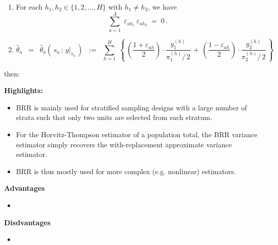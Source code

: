 \begin{proposition}
\begin{enumerate}
\item
	For each $h_{1}, h_{2} \in \{1,2,\ldots,H\}$ with $h_{1} \neq h_{2}$, we have
	\begin{equation*}
	\overset{A}{\underset{a=1}{\sum}}\;\varepsilon_{ah_{1}}\,\varepsilon_{ah_{2}} \; = \; 0\,.
	\end{equation*}
\item
	\begin{equation*}
	\widehat{\theta}_{a}
	\;\; = \;\;
		\widehat{\theta}_{a}\!\left(\,s_{a}\,;\,y\vert_{s_{a}}\,\right)
	\;\; := \;\;
		\overset{H}{\underset{h=1}{\sum}}\;
		\left\{\,
			\left(\dfrac{1+\varepsilon_{ah}}{2}\right)\cdot\dfrac{y^{(h)}_{1}}{\pi^{(h)}_{1}/\,2}
			\,+\,
			\left(\dfrac{1-\varepsilon_{ah}}{2}\right)\cdot\dfrac{y^{(h)}_{2}}{\pi^{(h)}_{2}/\,2}
			\,\right\}
	\end{equation*}
\end{enumerate}
then:
\end{proposition}

\vskip 0.5cm
\textbf{Highlights:}
\begin{itemize}
\item
	BRR is mainly used for stratified sampling designs
	with a large number of strata such that only
	two units are selected from each stratum.
\item
	For the Horvitz-Thompson estimator of a population total,
	the BRR variance estimator simply recovers the
	with-replacement approximate variance estimator.
\item
	BRR is thus mostly used for more complex (e.g. nonlinear) estimators.
\end{itemize}

\vskip 0.5cm
\noindent
\textbf{Advantages}
\begin{itemize}
\item

\end{itemize}

\vskip 0.5cm
\noindent
\textbf{Disdvantages}
\begin{itemize}
\item

\end{itemize}

